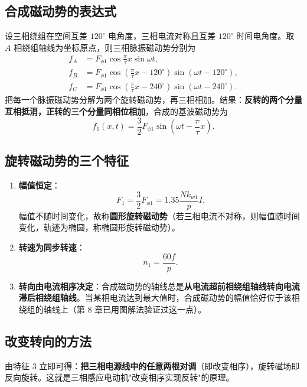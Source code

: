 \subsection{合成磁动势的表达式}
设三相绕组在空间互差 $120^\circ$ 电角度，三相电流对称且互差 $120^\circ$ 时间电角度。取 $A$ 相绕组轴线为坐标原点，则三相脉振磁动势分别为
\begin{equation}
\begin{aligned}
f_A&=F_{\phi1}\cos\frac{\pi}{\tau}x\sin\omega t,\\
f_B&=F_{\phi1}\cos\left(\frac{\pi}{\tau}x-120^\circ\right)\sin\left(\omega t-120^\circ\right),\\
f_C&=F_{\phi1}\cos\left(\frac{\pi}{\tau}x-240^\circ\right)\sin\left(\omega t-240^\circ\right).
\end{aligned}
\end{equation}
把每一个脉振磁动势分解为两个旋转磁动势，再三相相加。结果：\textbf{反转的两个分量互相抵消，正转的三个分量同相位相加}，合成的基波磁动势为
\begin{equation}
f_1(x,t)=\frac32F_{\phi1}\sin\left(\omega t-\frac{\pi}{\tau}x\right).
\end{equation}

\subsection{旋转磁动势的三个特征}
\begin{enumerate}
  \item \textbf{幅值恒定}：
  \begin{equation}
  F_1=\frac32F_{\phi1}=1.35\frac{Nk_{w1}}{p}I .
  \end{equation}
  幅值不随时间变化，故称\textbf{圆形旋转磁动势}（若三相电流不对称，则幅值随时间变化，轨迹为椭圆，称椭圆形旋转磁动势）。
  \item \textbf{转速为同步转速}：
  \begin{equation}
  n_1=\frac{60f}{p}.
  \end{equation}
  \item \textbf{转向由电流相序决定}：合成磁动势的轴线总是\textbf{从电流超前相绕组轴线转向电流滞后相绕组轴线}。当某相电流达到最大值时，合成磁动势的幅值恰好位于该相绕组的轴线上（第 8 章已用图解法验证过这一点）。
\end{enumerate}


\subsection{改变转向的方法}
由特征 3 立即可得：\textbf{把三相电源线中的任意两根对调}（即改变相序），旋转磁场即反向旋转。这就是三相感应电动机"改变相序实现反转"的原理。

